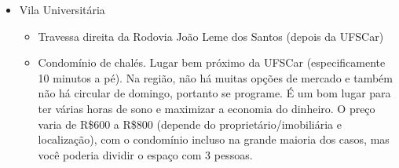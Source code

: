 \begin{itemize}
  \item Vila Universitária
    \begin{itemize}
      \item Travessa direita da Rodovia João Leme dos Santos (depois da UFSCar)
      \item Condomínio de chalés. Lugar bem próximo da UFSCar (especificamente 10 minutos a pé). 
          Na região, não há muitas opções de mercado e também não há circular de domingo, portanto se programe.
            É um bom lugar para ter várias horas de sono e maximizar a economia do dinheiro. O preço varia de R\$600 a R\$800 (depende do proprietário/imobiliária e localização), com o condomínio incluso na grande maioria dos casos, mas você poderia dividir o espaço com 3 pessoas.
    \end{itemize}


\end{itemize}
